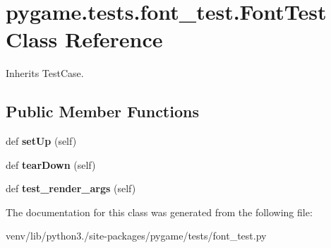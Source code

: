 \hypertarget{classpygame_1_1tests_1_1font__test_1_1_font_test}{}\section{pygame.\+tests.\+font\+\_\+test.\+Font\+Test Class Reference}
\label{classpygame_1_1tests_1_1font__test_1_1_font_test}


Inherits Test\+Case.

\subsection*{Public Member Functions}
\begin{DoxyCompactItemize}
\item 
\mbox{\label{classpygame_1_1tests_1_1font__test_1_1_font_test_a436262bbc5c6c06dda531276a17a17f8}} 
def {\bfseries set\+Up} (self)
\item 
\mbox{\label{classpygame_1_1tests_1_1font__test_1_1_font_test_abc51b7cf8619bd7b29b2cc527909f4db}} 
def {\bfseries tear\+Down} (self)
\item 
\mbox{\label{classpygame_1_1tests_1_1font__test_1_1_font_test_a03f3bd8762c028e03e35d2e2e95496b0}} 
def {\bfseries test\+\_\+render\+\_\+args} (self)
\end{DoxyCompactItemize}


The documentation for this class was generated from the following file\+:\begin{DoxyCompactItemize}
\item 
venv/lib/python3./site-\/packages/pygame/tests/font\+\_\+test.\+py\end{DoxyCompactItemize}
